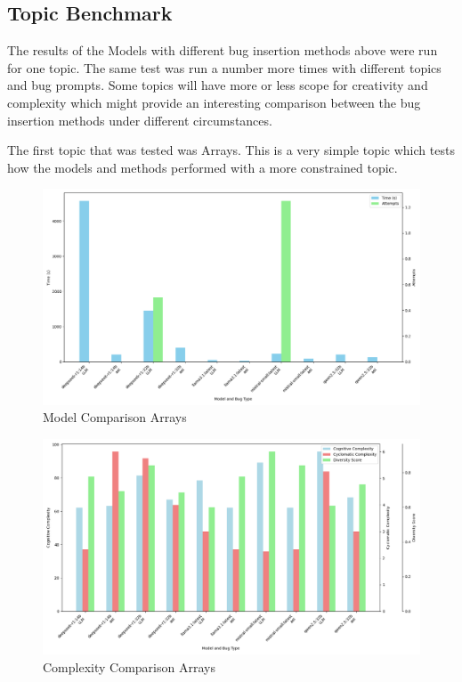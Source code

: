 \documentclass[12pt]{extarticle}
\begin{document}
\subsection{Topic Benchmark}

The results of the Models with different bug insertion methods above were run for one topic. The same test was run a number more times with different topics and bug prompts. Some topics will have more or less scope for creativity and complexity which might provide an interesting comparison between the bug insertion methods under different circumstances.

The first topic that was tested was Arrays. This is a very simple topic which tests how the models and methods performed with a more constrained topic.

\begin{figure}[h!]
\centering
\includegraphics[width=0.8\linewidth]{Images/Model_Comparison_Arrays.png}
\caption{Model Comparison Arrays}
\label{fig:Model_Comparison_Arrays}
\end{figure}

\begin{figure}[h!]
\centering
\includegraphics[width=0.8\linewidth]{Images/Complexity_Comparison_Arrays.png}
\caption{Complexity Comparison Arrays}
\label{fig:Complexity_Comparison_Arrays}
\end{figure}
\end{document}
